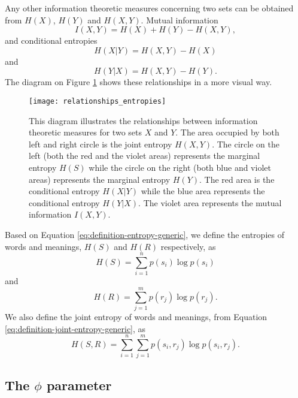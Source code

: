 Any other information theoretic measures concerning two sets can be obtained from $H(X)$, $H(Y)$ and $H(X,Y)$.
Mutual information
\begin{equation*}
  I(X,Y) = H(X) + H(Y) - H(X,Y),
\end{equation*}
and conditional entropies
\begin{equation*}
  H(X|Y) = H(X,Y) - H(X)
\end{equation*}
and
\begin{equation*}
  H(Y|X) = H(X,Y) - H(Y).
\end{equation*}
The diagram on Figure \ref{fig:relationships-entropies} shows these relationships in a more visual way.

\begin{figure}
  \centering
  \texttt{[image: relationships\_entropies]}
  \caption{
    This diagram illustrates the relationships between information theoretic measures for two sets $X$ and $Y$.
    The area occupied by both left and right circle is the joint entropy $H(X,Y)$.
    The circle on the left (both the red and the violet areas) represents the marginal entropy $H(S)$ while the circle on the right (both blue and violet areas) represents the marginal entropy $H(Y)$.
    The red area is the conditional entropy $H(X|Y)$ while the blue area represents the conditional entropy $H(Y|X)$.
    The violet area represents the mutual information $I(X,Y)$.
  }
  \label{fig:relationships-entropies}
\end{figure}

Based on Equation \ref{eq:definition-entropy-generic}, we define the entropies of words and meanings, $H(S)$ and $H(R)$ respectively, as
\begin{equation}
  \label{eq:definition-HS}
  H(S) = \sum_{i=1}^n p(s_i) \log p(s_i)
\end{equation}
and
\begin{equation}
  \label{eq:definition-HR}
  H(R) = \sum_{j=1}^m p(r_j) \log p(r_j).
\end{equation}
We also define the joint entropy of words and meanings, from Equation \ref{eq:definition-joint-entropy-generic}, as
\begin{equation}
  \label{eq:definition-HSR}
  H(S,R) = \sum_{i=1}^n \sum_{j=1}^m p(s_i, r_j) \log p(s_i, r_j).
\end{equation}

\subsection{The $\phi$ parameter}
\label{sec:introduction_model_phi}

